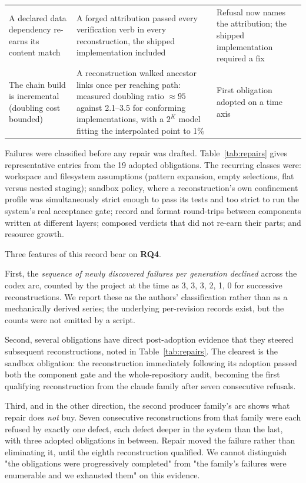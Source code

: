 \documentclass[10pt,twocolumn]{article}
\newcommand{\RQ}[1]{\textbf{RQ#1}}
\begin{document}
\begin{table}[t]
\begin{tabular}{@{}p{}p{}p{}@{}}
A declared data dependency re-earns its content match
  & A forged attribution passed every verification verb in every
    reconstruction, the shipped implementation included
  & Refusal now names the attribution; the shipped implementation
    required a fix \\
The chain build is incremental (doubling cost bounded)
  & A reconstruction walked ancestor links once per reaching path:
    measured doubling ratio ${\approx}95$ against 2.1--3.5 for
    conforming implementations, with a $2^{K}$ model fitting the
    interpolated point to 1\%
  & First obligation adopted on a time axis \\
\bottomrule
\end{tabular}
\end{table}

Failures were classified before any repair was drafted.
Table~\ref{tab:repairs} gives representative entries from the 19 adopted
obligations. The recurring classes were: workspace and filesystem
assumptions (pattern expansion, empty selections, flat versus nested
staging); sandbox policy, where a reconstruction's own confinement
profile was simultaneously strict enough to pass its tests and too
strict to run the system's real acceptance gate; record and format
round-trips between components written at different layers; composed
verdicts that did not re-earn their parts; and resource growth.

Three features of this record bear on \RQ{4}.

First, the \emph{sequence of newly discovered failures per generation
declined} across the codex arc, counted by the project at the time as
3, 3, 3, 2, 1, 0 for successive reconstructions. We report these as the
authors' classification rather than as a mechanically derived series;
the underlying per-revision records exist, but the counts were not
emitted by a script.

Second, several obligations have direct post-adoption evidence that they
steered subsequent reconstructions, noted in Table~\ref{tab:repairs}.
The clearest is the sandbox obligation: the reconstruction immediately
following its adoption passed both the component gate and the
whole-repository audit, becoming the first qualifying reconstruction from
the claude family after seven consecutive refusals.

Third, and in the other direction, the second producer family's arc shows
what repair does \emph{not} buy. Seven consecutive reconstructions from
that family were each refused by exactly one defect, each defect deeper
in the system than the last, with three adopted obligations in between.
Repair moved the failure rather than eliminating it, until the eighth
reconstruction qualified. We cannot distinguish "the obligations were
progressively completed" from "the family's failures were enumerable and
we exhausted them" on this evidence.
\end{document}
